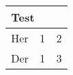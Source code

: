 \begin{table}[]
\begin{tabular}{@{}lll@{}}
\toprule
\multicolumn{3}{l}{Test} \\ \midrule
Her      & 1     & 2     \\
Der      & 1     & 3     \\ \bottomrule
\end{tabular}
\end{table}